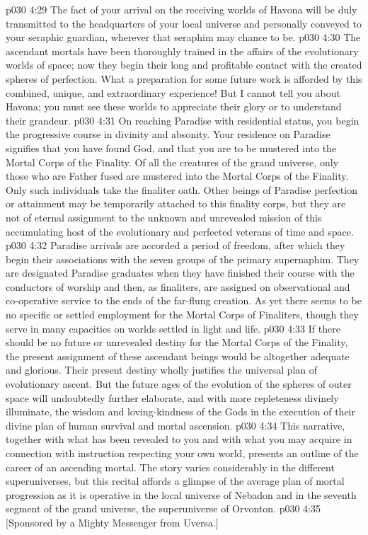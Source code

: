 \vs p030 4:29 The fact of your arrival on the receiving worlds of Havona will be duly transmitted to the headquarters of your local universe and personally conveyed to your seraphic guardian, wherever that seraphim may chance to be.\plusone
\vs p030 4:30 The ascendant mortals have been thoroughly trained in the affairs of the evolutionary worlds of space; now they begin their long and profitable contact with the created spheres of perfection. What a preparation for some future work is afforded by this combined, unique, and extraordinary experience! But I cannot tell you about Havona; you must see these worlds to appreciate their glory or to understand their grandeur.\plusone
\pc \vs p030 4:31 \bibnobreakspace {} On reaching Paradise with residential status, you begin the progressive course in divinity and absonity. Your residence on Paradise signifies that you have found God, and that you are to be mustered into the Mortal Corps of the Finality. Of all the creatures of the grand universe, only those who are Father fused are mustered into the Mortal Corps of the Finality. Only such individuals take the finaliter oath. Other beings of Paradise perfection or attainment may be temporarily attached to this finality corps, but they are not of eternal assignment to the unknown and unrevealed mission of this accumulating host of the evolutionary and perfected veterans of time and space.
\vs p030 4:32 Paradise arrivals are accorded a period of freedom, after which they begin their associations with the seven groups of the primary supernaphim. They are designated Paradise graduates when they have finished their course with the conductors of worship and then, as finaliters, are assigned on observational and co\hyp{}operative service to the ends of the far\hyp{}flung creation. As yet there seems to be no specific or settled employment for the Mortal Corps of Finaliters, though they serve in many capacities on worlds settled in light and life.
\vs p030 4:33 If there should be no future or unrevealed destiny for the Mortal Corps of the Finality, the present assignment of these ascendant beings would be altogether adequate and glorious. Their present destiny wholly justifies the universal plan of evolutionary ascent. But the future ages of the evolution of the spheres of outer space will undoubtedly further elaborate, and with more repleteness divinely illuminate, the wisdom and loving\hyp{}kindness of the Gods in the execution of their divine plan of human survival and mortal ascension.
\pc \vs p030 4:34 This narrative, together with what has been revealed to you and with what you may acquire in connection with instruction respecting your own world, presents an outline of the career of an ascending mortal. The story varies considerably in the different superuniverses, but this recital affords a glimpse of the average plan of mortal progression as it is operative in the local universe of Nebadon and in the seventh segment of the grand universe, the superuniverse of Orvonton.
\vsetoff
\vs p030 4:35 [Sponsored by a Mighty Messenger from Uversa.]
